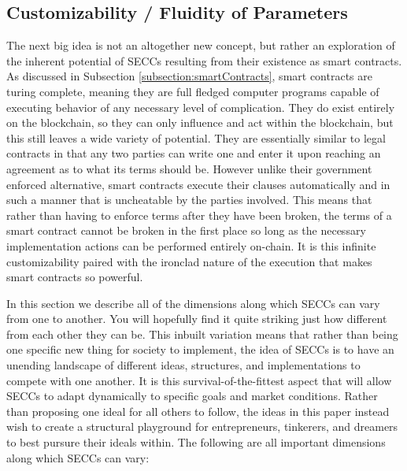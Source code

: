\documentclass{article}[10pt]
\begin{document}
\subsection{Customizability / Fluidity of Parameters}
\label{subsection:customizability}

The next big idea is not an altogether new concept, but rather an exploration of the inherent potential of SECCs resulting from their existence as smart contracts.
As discussed in Subsection \ref{subsection:smartContracts}, smart contracts are turing complete, meaning they are full fledged computer programs capable of executing behavior of any necessary level of complication.
They do exist entirely on the blockchain, so they can only influence and act within the blockchain, but this still leaves a wide variety of potential.
They are essentially similar to legal contracts in that any two parties can write one and enter it upon reaching an agreement as to what its terms should be.
However unlike their government enforced alternative, smart contracts execute their clauses automatically and in such a manner that is uncheatable by the parties involved.
This means that rather than having to enforce terms after they have been broken, the terms of a smart contract cannot be broken in the first place so long as the necessary implementation actions can be performed entirely on-chain.
It is this infinite customizability paired with the ironclad nature of the execution that makes smart contracts so powerful.\par

In this section we describe all of the dimensions along which SECCs can vary from one to another.
You will hopefully find it quite striking just how different from each other they can be.
This inbuilt variation means that rather than being one specific new thing for society to implement, the idea of SECCs is to have an unending landscape of different ideas, structures, and implementations to compete with one another.
It is this survival-of-the-fittest aspect that will allow SECCs to adapt dynamically to specific goals and market conditions.
Rather than proposing one ideal for all others to follow, the ideas in this paper instead wish to create a structural playground for entrepreneurs, tinkerers, and dreamers to best pursure their ideals within.
The following are all important dimensions along which SECCs can vary:\par 
\end{document}
